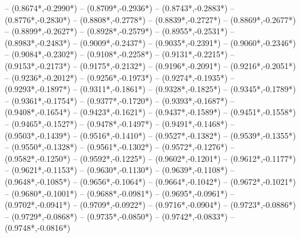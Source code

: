 {	-- ({0.8674*\dx},{-0.2990*\dy})
	-- ({0.8709*\dx},{-0.2936*\dy})
	-- ({0.8743*\dx},{-0.2883*\dy})
	-- ({0.8776*\dx},{-0.2830*\dy})
	-- ({0.8808*\dx},{-0.2778*\dy})
	-- ({0.8839*\dx},{-0.2727*\dy})
	-- ({0.8869*\dx},{-0.2677*\dy})
	-- ({0.8899*\dx},{-0.2627*\dy})
	-- ({0.8928*\dx},{-0.2579*\dy})
	-- ({0.8955*\dx},{-0.2531*\dy})
	-- ({0.8983*\dx},{-0.2483*\dy})
	-- ({0.9009*\dx},{-0.2437*\dy})
	-- ({0.9035*\dx},{-0.2391*\dy})
	-- ({0.9060*\dx},{-0.2346*\dy})
	-- ({0.9084*\dx},{-0.2302*\dy})
	-- ({0.9108*\dx},{-0.2258*\dy})
	-- ({0.9131*\dx},{-0.2215*\dy})
	-- ({0.9153*\dx},{-0.2173*\dy})
	-- ({0.9175*\dx},{-0.2132*\dy})
	-- ({0.9196*\dx},{-0.2091*\dy})
	-- ({0.9216*\dx},{-0.2051*\dy})
	-- ({0.9236*\dx},{-0.2012*\dy})
	-- ({0.9256*\dx},{-0.1973*\dy})
	-- ({0.9274*\dx},{-0.1935*\dy})
	-- ({0.9293*\dx},{-0.1897*\dy})
	-- ({0.9311*\dx},{-0.1861*\dy})
	-- ({0.9328*\dx},{-0.1825*\dy})
	-- ({0.9345*\dx},{-0.1789*\dy})
	-- ({0.9361*\dx},{-0.1754*\dy})
	-- ({0.9377*\dx},{-0.1720*\dy})
	-- ({0.9393*\dx},{-0.1687*\dy})
	-- ({0.9408*\dx},{-0.1654*\dy})
	-- ({0.9423*\dx},{-0.1621*\dy})
	-- ({0.9437*\dx},{-0.1589*\dy})
	-- ({0.9451*\dx},{-0.1558*\dy})
	-- ({0.9465*\dx},{-0.1527*\dy})
	-- ({0.9478*\dx},{-0.1497*\dy})
	-- ({0.9491*\dx},{-0.1468*\dy})
	-- ({0.9503*\dx},{-0.1439*\dy})
	-- ({0.9516*\dx},{-0.1410*\dy})
	-- ({0.9527*\dx},{-0.1382*\dy})
	-- ({0.9539*\dx},{-0.1355*\dy})
	-- ({0.9550*\dx},{-0.1328*\dy})
	-- ({0.9561*\dx},{-0.1302*\dy})
	-- ({0.9572*\dx},{-0.1276*\dy})
	-- ({0.9582*\dx},{-0.1250*\dy})
	-- ({0.9592*\dx},{-0.1225*\dy})
	-- ({0.9602*\dx},{-0.1201*\dy})
	-- ({0.9612*\dx},{-0.1177*\dy})
	-- ({0.9621*\dx},{-0.1153*\dy})
	-- ({0.9630*\dx},{-0.1130*\dy})
	-- ({0.9639*\dx},{-0.1108*\dy})
	-- ({0.9648*\dx},{-0.1085*\dy})
	-- ({0.9656*\dx},{-0.1064*\dy})
	-- ({0.9664*\dx},{-0.1042*\dy})
	-- ({0.9672*\dx},{-0.1021*\dy})
	-- ({0.9680*\dx},{-0.1001*\dy})
	-- ({0.9688*\dx},{-0.0981*\dy})
	-- ({0.9695*\dx},{-0.0961*\dy})
	-- ({0.9702*\dx},{-0.0941*\dy})
	-- ({0.9709*\dx},{-0.0922*\dy})
	-- ({0.9716*\dx},{-0.0904*\dy})
	-- ({0.9723*\dx},{-0.0886*\dy})
	-- ({0.9729*\dx},{-0.0868*\dy})
	-- ({0.9735*\dx},{-0.0850*\dy})
	-- ({0.9742*\dx},{-0.0833*\dy})
	-- ({0.9748*\dx},{-0.0816*\dy})
}
